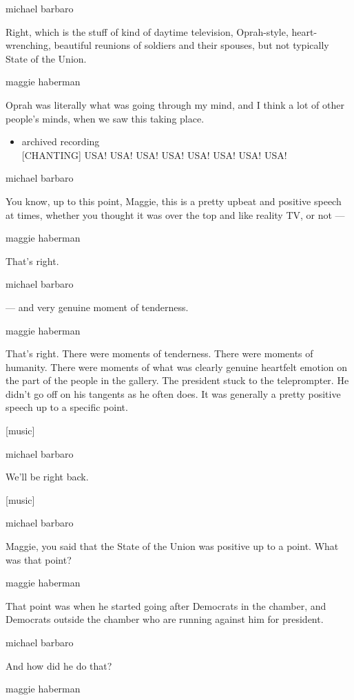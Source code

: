 michael barbaro

Right, which is the stuff of kind of daytime television, Oprah-style,
heart-wrenching, beautiful reunions of soldiers and their spouses, but
not typically State of the Union.

maggie haberman

Oprah was literally what was going through my mind, and I think a lot of
other people's minds, when we saw this taking place.

\begin{itemize}
\tightlist
\item
  archived recording\\
  {[}CHANTING{]} USA! USA! USA! USA! USA! USA! USA! USA!
\end{itemize}

michael barbaro

You know, up to this point, Maggie, this is a pretty upbeat and positive
speech at times, whether you thought it was over the top and like
reality TV, or not ---

maggie haberman

That's right.

michael barbaro

--- and very genuine moment of tenderness.

maggie haberman

That's right. There were moments of tenderness. There were moments of
humanity. There were moments of what was clearly genuine heartfelt
emotion on the part of the people in the gallery. The president stuck to
the teleprompter. He didn't go off on his tangents as he often does. It
was generally a pretty positive speech up to a specific point.

{[}music{]}

michael barbaro

We'll be right back.

{[}music{]}

michael barbaro

Maggie, you said that the State of the Union was positive up to a point.
What was that point?

maggie haberman

That point was when he started going after Democrats in the chamber, and
Democrats outside the chamber who are running against him for president.

michael barbaro

And how did he do that?

maggie haberman

